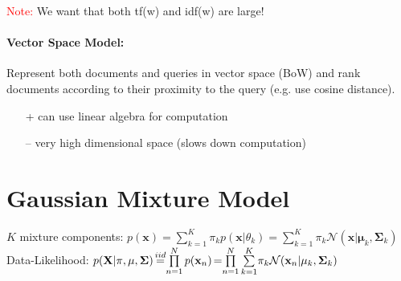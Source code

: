 \documentclass[a4paper,11pt]{article}
\newcommand{\msection}[1]{\section{#1}\vspace{-0.5mm}}
\begin{document}
\begin{multicols}{2}
\textcolor{red}{Note:} We want that both tf(w) and idf(w) are large!

\paragraph{Vector Space Model:} Represent both documents and queries in vector space (BoW) and rank documents according to their proximity to the query (e.g. use cosine distance).
\begin{itemize}[leftmargin=0.3cm]
  \item [+] can use linear algebra for computation
  \item [--] very high dimensional space (slows down computation)
\end{itemize}


\msection{Gaussian Mixture Model}
$K$ mixture components: 
$p(\mathbf x) = \sum\limits_{k=1}^K \pi_k p(\mathbf x | \theta_k) = \sum\limits_{k=1}^K \pi_k \mathcal N(\mathbf x | \mathbf \mu_k, \mathbf \Sigma_k)$\\
Data-Likelihood: 
$p(\mathbf X | \mathbf \pi, \mathbf\mu, \mathbf\Sigma) \hspace{-0.05cm} \overset{iid}{=} \hspace{-0.1cm} \prod\limits_{n=1}^N p(\mathbf x_n) \hspace{-0.05cm}  = \hspace{-0.1cm}  \prod\limits_{n=1}^N \sum\limits_{k=1}^K \hspace{-0.05cm}  \pi_k \mathcal N(\mathbf x_n| \mu_k, \mathbf \Sigma_k)$\\
\vspace{-0.2cm}

\end{multicols}
\end{document}
